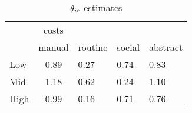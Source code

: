 \begin{table}[htbp]\centering \caption{$\theta\\_{ie}$ estimates} \begin{tabular}{l*{1}{c}} \toprule
            &       costs&            &            &            \\
            &      manual&     routine&      social&    abstract\\
\midrule
Low         &        0.89&        0.27&        0.74&        0.83\\
Mid         &        1.18&        0.62&        0.24&        1.10\\
High        &        0.99&        0.16&        0.71&        0.76\\
\bottomrule
\end{tabular}
\end{table}
